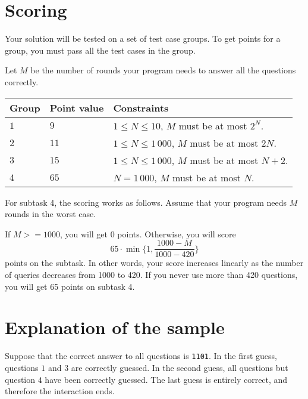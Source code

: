 \section*{Scoring}
Your solution will be tested on a set of test case groups.
To get points for a group, you must pass all the test cases in the group.

Let $M$ be the number of rounds your program needs to answer all the questions correctly.

\noindent
\begin{tabular}{| l | l | p{12cm} |}
  \hline
  \textbf{Group} & \textbf{Point value} & \textbf{Constraints} \\ \hline
  $1$    & $9$       & $1 \le N \le 10$, $M$ must be at most $2^N$. \\ \hline
  $2$    & $11$      & $1 \le N \le 1\,000$, $M$ must be at most $2N$. \\ \hline
  $3$    & $15$      & $1 \le N \le 1\,000$, $M$ must be at most $N + 2$. \\ \hline
  $4$    & $65$      & $N = 1\,000$, $M$ must be at most $N$. \\ \hline
\end{tabular}

For subtask 4, the scoring works as follows. Assume that your program needs $M$ rounds in the worst case.

If $M >= 1000$, you will get 0 points. Otherwise, you will score
\[ 65 \cdot \min \{ 1, \frac{1000-M}{1000-420} \} \]
points on the subtask. In other words, your score increases linearly as the number of queries decreases from 1000 to 420.
If you never use more than 420 questions, you will get 65 points on subtask 4.

\section*{Explanation of the sample}
Suppose that the correct answer to all questions is \texttt{1101}. In the first guess, questions $1$ and $3$ are correctly
guessed. In the second guess, all questions but question $4$ have been correctly guessed. The last guess is entirely correct,
and therefore the interaction ends.

